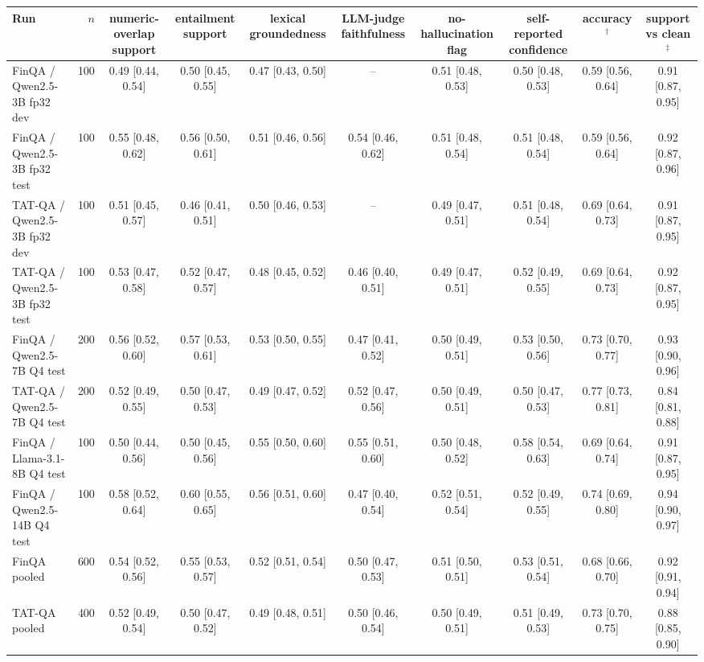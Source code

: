 \begin{tabular}{@{}l r cccccccc@{}}
\toprule
Run & $n$ & numeric-overlap support & entailment support & lexical groundedness & LLM-judge faithfulness & no-hallucination flag & self-reported confidence & accuracy$^\dagger$ & support vs clean$^\ddagger$ \\
\midrule
FinQA / Qwen2.5-3B fp32 dev & 100 & 0.49 \small[0.44, 0.54] & 0.50 \small[0.45, 0.55] & 0.47 \small[0.43, 0.50] & -- & 0.51 \small[0.48, 0.53] & 0.50 \small[0.48, 0.53] & 0.59 \small[0.56, 0.64] & 0.91 \small[0.87, 0.95] \\
FinQA / Qwen2.5-3B fp32 test & 100 & 0.55 \small[0.48, 0.62] & 0.56 \small[0.50, 0.61] & 0.51 \small[0.46, 0.56] & 0.54 \small[0.46, 0.62] & 0.51 \small[0.48, 0.54] & 0.51 \small[0.48, 0.54] & 0.59 \small[0.56, 0.64] & 0.92 \small[0.87, 0.96] \\
TAT-QA / Qwen2.5-3B fp32 dev & 100 & 0.51 \small[0.45, 0.57] & 0.46 \small[0.41, 0.51] & 0.50 \small[0.46, 0.53] & -- & 0.49 \small[0.47, 0.51] & 0.51 \small[0.48, 0.54] & 0.69 \small[0.64, 0.73] & 0.91 \small[0.87, 0.95] \\
TAT-QA / Qwen2.5-3B fp32 test & 100 & 0.53 \small[0.47, 0.58] & 0.52 \small[0.47, 0.57] & 0.48 \small[0.45, 0.52] & 0.46 \small[0.40, 0.51] & 0.49 \small[0.47, 0.51] & 0.52 \small[0.49, 0.55] & 0.69 \small[0.64, 0.73] & 0.92 \small[0.87, 0.95] \\
FinQA / Qwen2.5-7B Q4 test & 200 & 0.56 \small[0.52, 0.60] & 0.57 \small[0.53, 0.61] & 0.53 \small[0.50, 0.55] & 0.47 \small[0.41, 0.52] & 0.50 \small[0.49, 0.51] & 0.53 \small[0.50, 0.56] & 0.73 \small[0.70, 0.77] & 0.93 \small[0.90, 0.96] \\
TAT-QA / Qwen2.5-7B Q4 test & 200 & 0.52 \small[0.49, 0.55] & 0.50 \small[0.47, 0.53] & 0.49 \small[0.47, 0.52] & 0.52 \small[0.47, 0.56] & 0.50 \small[0.49, 0.51] & 0.50 \small[0.47, 0.53] & 0.77 \small[0.73, 0.81] & 0.84 \small[0.81, 0.88] \\
FinQA / Llama-3.1-8B Q4 test & 100 & 0.50 \small[0.44, 0.56] & 0.50 \small[0.45, 0.56] & 0.55 \small[0.50, 0.60] & 0.55 \small[0.51, 0.60] & 0.50 \small[0.48, 0.52] & 0.58 \small[0.54, 0.63] & 0.69 \small[0.64, 0.74] & 0.91 \small[0.87, 0.95] \\
FinQA / Qwen2.5-14B Q4 test & 100 & 0.58 \small[0.52, 0.64] & 0.60 \small[0.55, 0.65] & 0.56 \small[0.51, 0.60] & 0.47 \small[0.40, 0.54] & 0.52 \small[0.51, 0.54] & 0.52 \small[0.49, 0.55] & 0.74 \small[0.69, 0.80] & 0.94 \small[0.90, 0.97] \\
\midrule
FinQA pooled & 600 & 0.54 \small[0.52, 0.56] & 0.55 \small[0.53, 0.57] & 0.52 \small[0.51, 0.54] & 0.50 \small[0.47, 0.53] & 0.51 \small[0.50, 0.51] & 0.53 \small[0.51, 0.54] & 0.68 \small[0.66, 0.70] & 0.92 \small[0.91, 0.94] \\
\midrule
TAT-QA pooled & 400 & 0.52 \small[0.49, 0.54] & 0.50 \small[0.47, 0.52] & 0.49 \small[0.48, 0.51] & 0.50 \small[0.46, 0.54] & 0.50 \small[0.49, 0.51] & 0.51 \small[0.49, 0.53] & 0.73 \small[0.70, 0.75] & 0.88 \small[0.85, 0.90] \\
\bottomrule
\end{tabular}